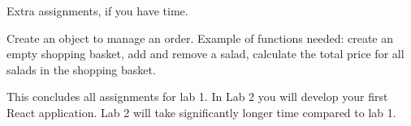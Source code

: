\documentclass[fleqn, article, a4paper]{memoir}
\begin{document}
\noindent Extra assignments, if you have time.
\begin{Assignments}

\item Create an object to manage an order. Example of functions needed: create an empty shopping basket, add and remove a salad, calculate the total price for all salads in the shopping basket.

\end{Assignments}

\noindent This concludes all assignments for lab 1. In Lab 2 you will develop your first React application. Lab 2 will take significantly longer time compared to lab 1.


\end{document}
